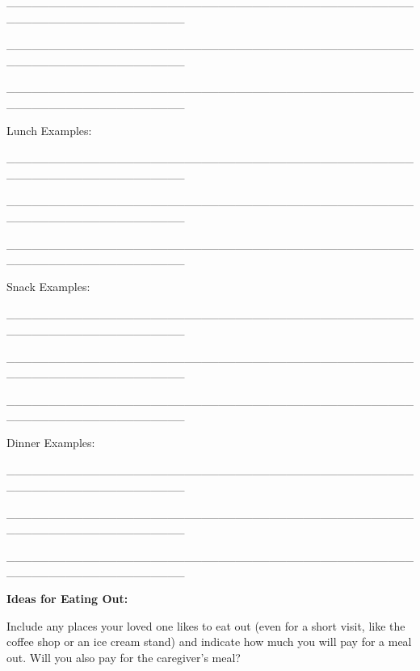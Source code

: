 \documentclass[]{article}
\begin{document}
\_\_\_\_\_\_\_\_\_\_\_\_\_\_\_\_\_\_\_\_\_\_\_\_\_\_\_\_\_\_\_\_\_\_\_\_\_\_\_\_\_\_\_\_\_\_\_\_\_\_\_\_\_\_\_\_\_\_\_\_\_\_\_\_\_\_\_\_\_

\_\_\_\_\_\_\_\_\_\_\_\_\_\_\_\_\_\_\_\_\_\_\_\_\_\_\_\_\_\_\_\_\_\_\_\_\_\_\_\_\_\_\_\_\_\_\_\_\_\_\_\_\_\_\_\_\_\_\_\_\_\_\_\_\_\_\_\_\_

\_\_\_\_\_\_\_\_\_\_\_\_\_\_\_\_\_\_\_\_\_\_\_\_\_\_\_\_\_\_\_\_\_\_\_\_\_\_\_\_\_\_\_\_\_\_\_\_\_\_\_\_\_\_\_\_\_\_\_\_\_\_\_\_\_\_\_\_\_

Lunch Examples:

\_\_\_\_\_\_\_\_\_\_\_\_\_\_\_\_\_\_\_\_\_\_\_\_\_\_\_\_\_\_\_\_\_\_\_\_\_\_\_\_\_\_\_\_\_\_\_\_\_\_\_\_\_\_\_\_\_\_\_\_\_\_\_\_\_\_\_\_\_

\_\_\_\_\_\_\_\_\_\_\_\_\_\_\_\_\_\_\_\_\_\_\_\_\_\_\_\_\_\_\_\_\_\_\_\_\_\_\_\_\_\_\_\_\_\_\_\_\_\_\_\_\_\_\_\_\_\_\_\_\_\_\_\_\_\_\_\_\_

\_\_\_\_\_\_\_\_\_\_\_\_\_\_\_\_\_\_\_\_\_\_\_\_\_\_\_\_\_\_\_\_\_\_\_\_\_\_\_\_\_\_\_\_\_\_\_\_\_\_\_\_\_\_\_\_\_\_\_\_\_\_\_\_\_\_\_\_\_

Snack Examples:

\_\_\_\_\_\_\_\_\_\_\_\_\_\_\_\_\_\_\_\_\_\_\_\_\_\_\_\_\_\_\_\_\_\_\_\_\_\_\_\_\_\_\_\_\_\_\_\_\_\_\_\_\_\_\_\_\_\_\_\_\_\_\_\_\_\_\_\_\_

\_\_\_\_\_\_\_\_\_\_\_\_\_\_\_\_\_\_\_\_\_\_\_\_\_\_\_\_\_\_\_\_\_\_\_\_\_\_\_\_\_\_\_\_\_\_\_\_\_\_\_\_\_\_\_\_\_\_\_\_\_\_\_\_\_\_\_\_\_

\_\_\_\_\_\_\_\_\_\_\_\_\_\_\_\_\_\_\_\_\_\_\_\_\_\_\_\_\_\_\_\_\_\_\_\_\_\_\_\_\_\_\_\_\_\_\_\_\_\_\_\_\_\_\_\_\_\_\_\_\_\_\_\_\_\_\_\_\_

Dinner Examples:

\_\_\_\_\_\_\_\_\_\_\_\_\_\_\_\_\_\_\_\_\_\_\_\_\_\_\_\_\_\_\_\_\_\_\_\_\_\_\_\_\_\_\_\_\_\_\_\_\_\_\_\_\_\_\_\_\_\_\_\_\_\_\_\_\_\_\_\_\_

\_\_\_\_\_\_\_\_\_\_\_\_\_\_\_\_\_\_\_\_\_\_\_\_\_\_\_\_\_\_\_\_\_\_\_\_\_\_\_\_\_\_\_\_\_\_\_\_\_\_\_\_\_\_\_\_\_\_\_\_\_\_\_\_\_\_\_\_\_

\_\_\_\_\_\_\_\_\_\_\_\_\_\_\_\_\_\_\_\_\_\_\_\_\_\_\_\_\_\_\_\_\_\_\_\_\_\_\_\_\_\_\_\_\_\_\_\_\_\_\_\_\_\_\_\_\_\_\_\_\_\_\_\_\_\_\_\_\_

\textbf{Ideas for Eating Out:}

Include any places your loved one likes to eat out (even for a short
visit, like the coffee shop or an ice cream stand) and indicate how much
you will pay for a meal out. Will you also pay for the caregiver's meal?
\end{document}
